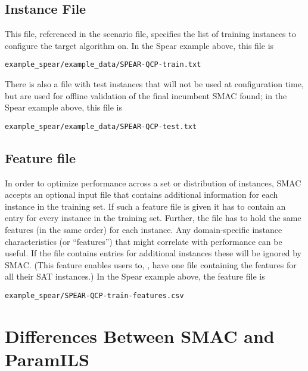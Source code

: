 \documentclass[11pt,letterpaper,twoside]{article}
\begin{document}
\subsection{Instance File}
This file, referenced in the scenario file, specifies the list of training instances to configure the target algorithm on. 
In the Spear example above, this file is

{\footnotesize
\begin{alltt}
example_spear/example_data/SPEAR-QCP-train.txt
\end{alltt}}

There is also a file with test instances that will not be used at configuration time, but are used for offline validation of the final incumbent SMAC found; in the Spear example above, this file is

{\footnotesize
\begin{alltt}
example_spear/example_data/SPEAR-QCP-test.txt
\end{alltt}}

\subsection{Feature file}
In order to optimize performance across a set or distribution of instances, SMAC accepts an optional input file that contains additional information for each instance in the training set. If such a feature file is given it has to contain an entry for every instance in the training set. Further, the file has to hold the same features (in the same order) for each instance.
Any domain-specific instance characteristics (or ``features'') that might correlate with performance can be useful. If the file contains entries for additional instances these will be ignored by SMAC. (This feature enables users to, \eg{}, have one file containing the features for all their SAT instances.) In the Spear example above, the feature file is

{\footnotesize
\begin{alltt}
example_spear/SPEAR-QCP-train-features.csv
\end{alltt}}
 
\section{Differences Between SMAC and ParamILS}
\end{document}
